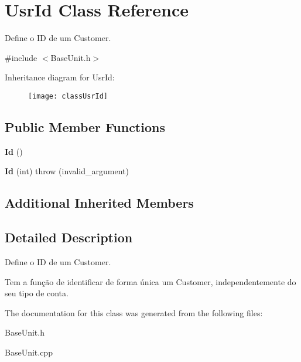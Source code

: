 \hypertarget{classUsrId}{\section{Usr\-Id Class Reference}
\label{classUsrId}
}


Define o I\-D de um Customer.  




{\ttfamily \#include $<$Base\-Unit.\-h$>$}

Inheritance diagram for Usr\-Id\-:\begin{figure}[H]
\begin{center}
\leavevmode
\texttt{[image: classUsrId]}
\end{center}
\end{figure}
\subsection*{Public Member Functions}
\begin{DoxyCompactItemize}
\item 
\hypertarget{classUsrId_a90f49e923fb187c5330f71a75cd643a2}{{\bfseries Id} ()}\label{classUsrId_a90f49e923fb187c5330f71a75cd643a2}

\item 
\hypertarget{classUsrId_a492418ee700c6a34d1dda28054b369b0}{{\bfseries Id} (int)  throw (invalid\-\_\-argument)}\label{classUsrId_a492418ee700c6a34d1dda28054b369b0}

\end{DoxyCompactItemize}
\subsection*{Additional Inherited Members}


\subsection{Detailed Description}
Define o I\-D de um Customer. 

Tem a função de identificar de forma única um Customer, independentemente do seu tipo de conta. 

The documentation for this class was generated from the following files\-:\begin{DoxyCompactItemize}
\item 
Base\-Unit.\-h\item 
Base\-Unit.\-cpp\end{DoxyCompactItemize}
